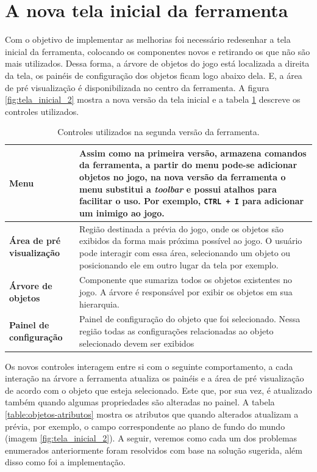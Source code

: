 \documentclass[12pt,oneside,openright,a4paper,english,brazil,sumario=tradicional]{abntex2}
\begin{document}
\section{A nova tela inicial da ferramenta}
Com o objetivo de implementar as melhorias foi necessário redesenhar a tela inicial da ferramenta, colocando os componentes novos e retirando os que não são mais utilizados. Dessa forma, a árvore de objetos do jogo está localizada a direita da tela, os painéis de configuração dos objetos ficam logo abaixo dela. E, a área de pré visualização é disponibilizada no centro da ferramenta.  A figura \ref{fig:tela_inicial_2} mostra a nova versão da tela inicial e a tabela \ref{table:ferramenta_areas_2} descreve os controles utilizados.

\begin{table}[h]
   \centering
   \begin{tabular}{| l | p{8cm} |}
      \hline
      \textbf{Menu} & Assim como na primeira versão, armazena comandos da ferramenta, a partir do menu pode-se adicionar objetos no jogo, na nova versão da ferramenta o menu substitui a \emph{toolbar} e possui atalhos para facilitar o uso. Por exemplo, \texttt{CTRL + I} para adicionar um inimigo ao jogo. \\
      \hline
      \textbf{Área de pré visualização} & Região  destinada a prévia do jogo, onde os objetos são exibidos da forma mais próxima possível ao jogo. O usuário pode interagir com essa área, selecionando um objeto ou posicionando ele em outro lugar da tela por exemplo.\\
      \hline
      \textbf{Árvore de objetos} & Componente que sumariza todos os objetos existentes no jogo. A árvore é responsável por exibir os objetos em sua hierarquia.\\
      \hline
      \textbf{Painel de configuração} & Painel de configuração do objeto que foi selecionado. Nessa região todas as configurações relacionadas ao objeto selecionado devem ser exibidos \\
      \hline
   \end{tabular}
   \caption{Controles utilizados na segunda versão da ferramenta.}
   \label{table:ferramenta_areas_2}
\end{table}

Os novos controles interagem entre si com o seguinte comportamento, a cada interação na árvore a ferramenta atualiza os painéis e a área de pré visualização de acordo com o objeto que esteja selecionado. Este que, por sua vez, é atualizado também quando algumas propriedades são alteradas no painel. A tabela \ref{table:objetos-atributos} mostra os atributos que quando alterados atualizam a prévia, por exemplo, o campo correspondente ao plano de fundo do mundo (imagem \ref{fig:tela_inicial_2}).
A seguir, veremos como cada um dos problemas enumerados anteriormente foram resolvidos com base na solução sugerida, além disso como foi a implementação.
\end{document}
